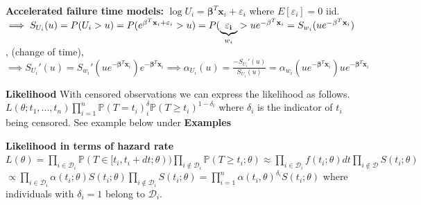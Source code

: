 \documentclass{article}
\begin{document}
\textbf{Accelerated failure time models:} $\log U_i = \mathbf{\beta}^T\mathbf{x}_i + \varepsilon_i$ where $E[\varepsilon_i]=0$ iid. $\implies S_{U_i}(u)=P(U_i>u)=P(e^{\mathbf{\beta}^T\mathbf{x}_i + \varepsilon_i}>u) = \\ P(\underbrace{\mathbf{\varepsilon_i}}_{w_i} > ue^{-\mathbf{\beta}^T\mathbf{x}_i} = S_{w_i}(ue^{-\mathbf{\beta}^T\mathbf{x}_i})$, (change of time), $\implies S_{U_i}'(u) = S_{w_i}'(ue^{-\mathbf{\beta}^T\mathbf{x}_i})e^{-\mathbf{\beta}^T\mathbf{x}_i} \implies \alpha_{U_i}(u) = \frac{-S_{U_i}'(u)}{S_{U_i}(u)} = \alpha_{w_i}(ue^{-\mathbf{\beta}^T\mathbf{x}_i})ue^{-\mathbf{\beta}^T\mathbf{x}_i}$

\medskip

\textbf{Likelihood} With censored observations we can express the likelihood as follows. $L(\theta; t_1,...,t_n)\prod_{i=1}^n \mathbb{P}(T = t_i)^\delta_i \mathbb{P}(T \geq t_i)^{1-\delta_i}$ where $\delta_i$ is the indicator of $t_i$ being censored. See example below under \textbf{Examples}

\medskip

\textbf{Likelihood in terms of hazard rate} $L(\theta) = \prod_{i\in \mathcal{D}_i}\mathbb{P}(T\in[t_i, t_i +dt;\theta))\prod_{i\notin \mathcal{D}_i}\mathbb{P}(T\geq t_i; \theta) \approx \prod_{i \in \mathcal{D}_i} f(t_i;\theta)dt\prod_{i \notin \mathcal{D}} S(t_i; \theta)$ \newline $\propto \prod_{i\in \mathcal{D}_i}\alpha(t_i;\theta)S(t_i;\theta)\prod_{i\notin \mathcal{D}_i}S(t_i;\theta) = \prod_{i=1}^n \alpha(t_i,\theta)^{\delta_i}S(t_i;\theta)$ where individuals with $\delta_i = 1$ belong to $\mathcal{D}_i$.

\medskip
\end{document}
